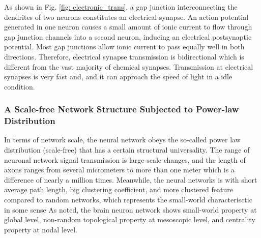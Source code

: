 \documentclass[journal,comsoc]{IEEEtran}
\begin{document}
				As shown in Fig. \ref{fig: electronic_trans}, a gap junction interconnecting the dendrites of two neurons constitutes an electrical synapse.
				An action potential generated in one neuron causes a small amount of ionic current to flow through gap junction channels into a second neuron, 
				inducing an electrical postsynaptic potential.	
				Most gap junctions allow ionic current to pass equally well in both directions.
				Therefore, electrical synapse transmission is bidirectional which is different from the vast majority of chemical synapses.
				Transmission at electrical synapses is very fast and, and it can approach the speed of light in a idle condition. 
%			
			\subsubsection{A Scale-free Network Structure Subjected to Power-law Distribution}
			
				In terms of network scale, the neural network obeys the so-called power law distribution (scale-free) that has a certain structural universality\cite{bibid}.
				The range of neuronal network signal transmission is large-scale changes, and the length of axons ranges from several micrometers to more than one meter which is a difference of nearly a million times.
				Meanwhile, the neural networks is with short average path length, big clustering coefficient, and more clustered feature compared to random networks, which represents the small-world characterisctic in some sense\cite{eguiluz2005scale}
				As \cite{papo2014complex} noted, the brain neuron network shows small-world property at global level, non-random topological property at mesoscopic level, and centrality property at nodal level. 
			
\end{document}
